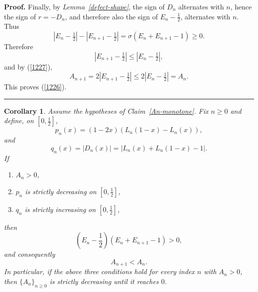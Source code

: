 \documentclass[onecolumn]{article}
\newtheorem{corollary}[theorem]{Corollary}
\newenvironment{proof}[1][Proof]{\noindent\textbf{#1.} }{\ \rule{0.5em}{0.5em}}
\begin{document}
\begin{proof}
Finally, by \textit{Lemma~\ref{defect-shape}}, the sign of $D_{n}$
alternates with $n$, hence the sign of $r=-D_{n}$, and therefore also the
sign of $E_{n}-\frac{1}{2}$, alternates with $n$. Thus 
\begin{equation}
|E_{n}-\tfrac{1}{2}|-|E_{n+1}-\tfrac{1}{2}|=\sigma \left(
E_{n}+E_{n+1}-1\right) \geq 0.  \label{1254}
\end{equation}%
Therefore 
\begin{equation}
|E_{n+1}-\tfrac{1}{2}|\leq |E_{n}-\tfrac{1}{2}|,  \label{1255}
\end{equation}%
and by (\ref{1227}), 
\begin{equation}
A_{n+1}=2|E_{n+1}-\tfrac{1}{2}|\leq 2|E_{n}-\tfrac{1}{2}|=A_{n}.
\label{1256}
\end{equation}%
This proves (\ref{1226}). \hfill
\end{proof}

\begin{corollary}
\label{An-strict} Assume the hypotheses of \textit{Claim~\ref{An-monotone}}.
Fix $n\geq 0$ and define, on $[0,\tfrac{1}{2}]$, 
\begin{equation}
p_{n}(x)=(1-2x)(L_{n}(1-x)-L_{n}(x)),  \label{1257}
\end{equation}%
and 
\begin{equation}
q_{n}(x)=|D_{n}(x)|=|L_{n}(x)+L_{n}(1-x)-1|.  \label{1258}
\end{equation}%
If

\begin{enumerate}
\item $A_{n}>0$,

\item $p_{n}$ is strictly decreasing on $[0,\tfrac{1}{2}]$,

\item $q_{n}$ is strictly increasing on $[0,\tfrac{1}{2}]$,
\end{enumerate}

then 
\begin{equation}
\left( E_{n}-\frac{1}{2}\right) \left( E_{n}+E_{n+1}-1\right) >0,
\label{1259}
\end{equation}%
and consequently 
\begin{equation}
A_{n+1}<A_{n}.  \label{1260}
\end{equation}%
In particular, if the above three conditions hold for every index $n$ with $%
A_{n}>0$, then $\{A_{n}\}_{n\geq 0}$ is strictly decreasing until it reaches 
$0$.
\end{corollary}
\end{document}

